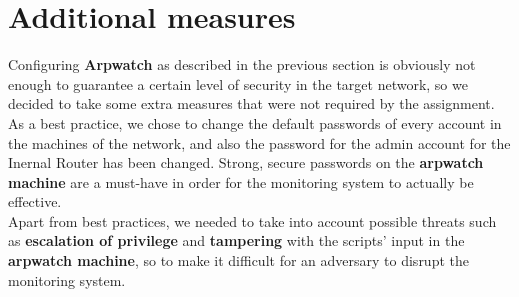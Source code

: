 \section{Additional measures}
Configuring \textbf{Arpwatch} as described in the previous section is obviously not enough to guarantee a certain level of security in the target network, so we decided to take some extra measures that were not required by the assignment.\\
As a best practice, we chose to change the default passwords of every account in the machines of the network, and also the password for the admin account for the Inernal Router has been changed. Strong, secure passwords on the \textbf{arpwatch machine} are a must-have in order for the monitoring system to actually be effective.\\
Apart from best practices, we needed to take into account possible threats such as \textbf{escalation of privilege} and \textbf{tampering} with the scripts' input in the \textbf{arpwatch machine}, so to make it difficult for an adversary to disrupt the monitoring system.

